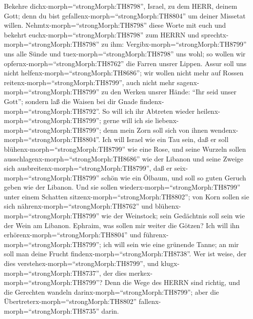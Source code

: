  Bekehre dichx-morph=``strongMorph:TH8798'', Israel, zu dem
HERR, deinem Gott; denn du bist gefallenx-morph=``strongMorph:TH8804''
um deiner Missetat willen. 
Nehmtx-morph=``strongMorph:TH8798'' diese Worte mit euch und bekehrt
euchx-morph=``strongMorph:TH8798'' zum HERRN und
sprechtx-morph=``strongMorph:TH8798'' zu ihm:
Vergibx-morph=``strongMorph:TH8799'' uns alle Sünde und
tuex-morph=``strongMorph:TH8798'' uns wohl; so wollen wir
opfernx-morph=``strongMorph:TH8762'' die Farren unsrer Lippen.
 Assur soll uns nicht helfenx-morph=``strongMorph:TH8686'';
wir wollen nicht mehr auf Rossen reitenx-morph=``strongMorph:TH8799'',
auch nicht mehr sagenx-morph=``strongMorph:TH8799'' zu den Werken unsrer
Hände: ``Ihr seid unser Gott''; sondern laß die Waisen bei dir Gnade
findenx-morph=``strongMorph:TH8792''.  So will ich ihr
Abtreten wieder heilenx-morph=``strongMorph:TH8799''; gerne will ich sie
liebenx-morph=``strongMorph:TH8799''; denn mein Zorn soll sich von ihnen
wendenx-morph=``strongMorph:TH8804''.  Ich will Israel wie
ein Tau sein, daß er soll blühenx-morph=``strongMorph:TH8799'' wie eine
Rose, und seine Wurzeln sollen ausschlagenx-morph=``strongMorph:TH8686''
wie der Libanon  und seine Zweige sich
ausbreitenx-morph=``strongMorph:TH8799'', daß er
seix-morph=``strongMorph:TH8799'' schön wie ein Ölbaum, und soll so
guten Geruch geben wie der Libanon.  Und sie sollen
wiederx-morph=``strongMorph:TH8799'' unter einem Schatten
sitzenx-morph=``strongMorph:TH8802''; von Korn sollen sie sich
nährenx-morph=``strongMorph:TH8762'' und
blühenx-morph=``strongMorph:TH8799'' wie der Weinstock; sein Gedächtnis
soll sein wie der Wein am Libanon.  Ephraim, was sollen mir
weiter die Götzen? Ich will ihn erhörenx-morph=``strongMorph:TH8804''
und führenx-morph=``strongMorph:TH8799''; ich will sein wie eine
grünende Tanne; an mir soll man deine Frucht
findenx-morph=``strongMorph:TH8738''.  Wer ist weise, der
dies verstehex-morph=``strongMorph:TH8799'', und
klugx-morph=``strongMorph:TH8737'', der dies
merkex-morph=``strongMorph:TH8799''? Denn die Wege des HERRN sind
richtig, und die Gerechten wandeln darinx-morph=``strongMorph:TH8799'';
aber die Übertreterx-morph=``strongMorph:TH8802''
fallenx-morph=``strongMorph:TH8735'' darin.
